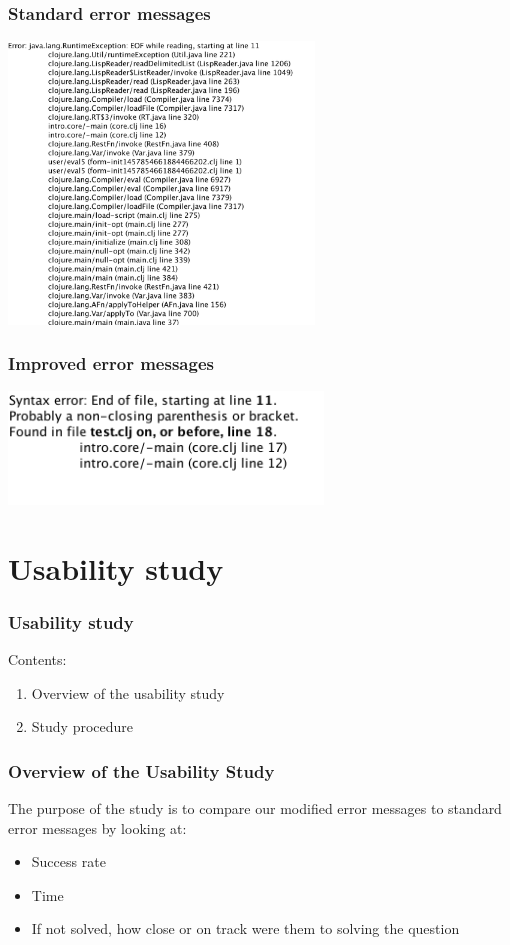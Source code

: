 \documentclass{beamer}
\begin{document}
\begin{frame}
	\frametitle{Standard error messages}
	\includegraphics[height=75mm]{standard.png}
\end{frame}

\begin{frame}
	\frametitle{Improved error messages}
	\includegraphics[height=30mm]{improved.png}
\end{frame}

\section{Usability study}

\begin{frame}
  \frametitle{Usability study}
Contents:
\begin{enumerate}
\item Overview of the usability study 
\item Study procedure
\end{enumerate}
\end{frame}


\begin{frame}
  \frametitle{Overview of the Usability Study}
The purpose of the study is to compare our modified error messages to standard error messages by looking at:
\begin{itemize}
\item Success rate
\item Time
\item If not solved, how close or on track were them to solving the question
\end{itemize} 
\end{frame}
\end{document}
